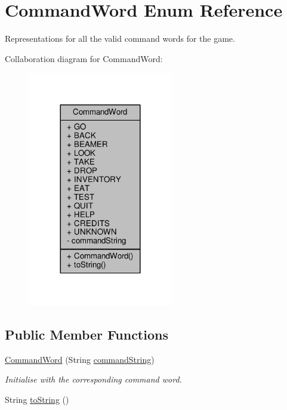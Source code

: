 \hypertarget{enumCommandWord}{\section{Command\-Word Enum Reference}
\label{enumCommandWord}
}


Representations for all the valid command words for the game.  




Collaboration diagram for Command\-Word\-:
\nopagebreak
\begin{figure}[H]
\begin{center}
\leavevmode
\includegraphics[width=180pt]{enumCommandWord__coll__graph}
\end{center}
\end{figure}
\subsection*{Public Member Functions}
\begin{DoxyCompactItemize}
\item 
\hyperlink{enumCommandWord_a7542ac054c8ee2abf183e01d4e5d2d1f}{Command\-Word} (String \hyperlink{enumCommandWord_ae396b905ac83b5717c56b67e1e47aeef}{command\-String})
\begin{DoxyCompactList}\small\item\em Initialise with the corresponding command word. \end{DoxyCompactList}\item 
String \hyperlink{enumCommandWord_a923828e4531df99a4654d35d160ec486}{to\-String} ()
\end{DoxyCompactItemize}

